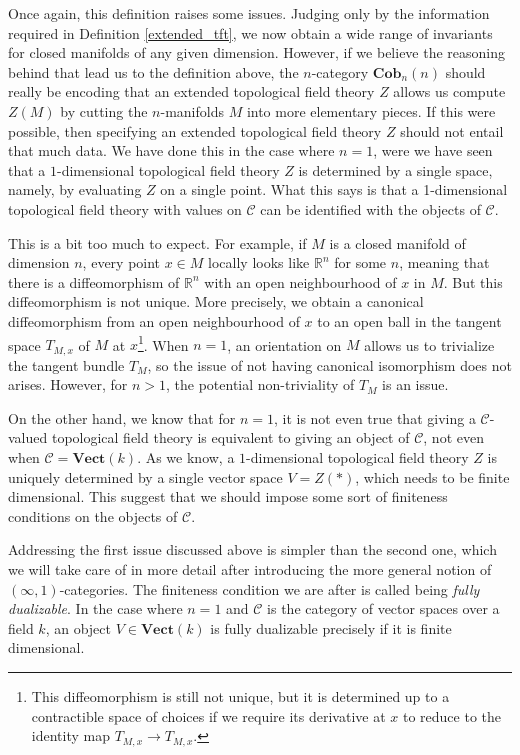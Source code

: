 \documentclass[a4paper,11pt]{article}
\newcommand{\ccal}{\mathcal{C}}
\newcommand{\vecto}{\mathbf{Vect}}
\theoremstyle{plain}
\theoremstyle{definition}
\theoremstyle{remark}
\begin{document}
Once again, this definition raises some issues. Judging only by the information required in Definition \ref{extended_tft}, we now obtain a wide range of invariants for closed manifolds of any given dimension. However, if we believe the reasoning behind that lead us to the definition above, the $n$-category $\textbf{Cob}_n(n)$ should really be encoding that an extended topological field theory $Z$ allows us compute $Z(M)$ by cutting the $n$-manifolds $M$ into more elementary pieces. If this were possible, then specifying an extended topological field theory $Z$ should not entail that much data. We have done this in the case where $n = 1$, were we have seen that a $1$-dimensional topological field theory $Z$ is determined by a single space, namely, by evaluating $Z$ on a single point. What this says is that a 1-dimensional topological field theory with values on $\ccal$ can be identified with the objects of $\ccal$. 


This is a bit too much to expect. For example, if $M$ is a closed manifold of dimension $n$, every point $x \in M$ locally looks like $\mathbb{R}^n$ for some $n$, meaning that there is a diffeomorphism of $\mathbb{R}^n$ with an open neighbourhood of $x$ in $M$. But this diffeomorphism is not unique. More precisely, we obtain a canonical diffeomorphism from an open neighbourhood of $x$ to an open ball in the tangent space $T_{M,x}$ of $M$ at $x$\footnote{This diffeomorphism is still not unique, but it is determined up to a contractible space of choices if we require its derivative at $x$ to reduce to the identity map $T_{M,x} \to T_{M,x}$.}. When $n =1$, an orientation on $M$ allows us to trivialize the tangent bundle $T_M$, so the issue of not having canonical isomorphism does not arises. However, for $n >1$, the potential non-triviality of $T_M$ is an issue. 

On the other hand, we know that for $n = 1$, it is not even true that giving a $\ccal$-valued topological field theory is equivalent to giving an object of $\ccal$, not even when $\ccal = \vecto(k)$. As we know, a $1$-dimensional topological field theory $Z$ is uniquely determined by a single vector space $V = Z(*)$, which needs to be finite dimensional. This suggest that we should impose some sort of finiteness conditions on the objects of $\ccal$.


Addressing the first issue discussed above is simpler than the second one, which we will take care of in more detail after introducing the more general notion of $(\infty, 1)$-categories. The finiteness condition we are after is called being \textit{fully dualizable}. In the case where $n = 1$ and $\ccal$ is the category of vector spaces over a field $k$, an object $V \in \vecto(k)$ is fully dualizable precisely if it is finite dimensional. 
\end{document}

